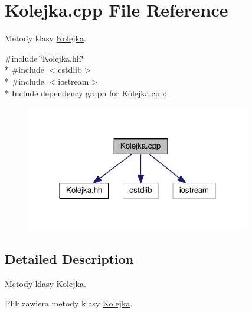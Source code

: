 \hypertarget{a00013}{}\section{Kolejka.\+cpp File Reference}
\label{a00013}


Metody klasy \hyperlink{a00004}{Kolejka}.  


{\ttfamily \#include \char`\"{}Kolejka.\+hh\char`\"{}}\\*
{\ttfamily \#include $<$cstdlib$>$}\\*
{\ttfamily \#include $<$iostream$>$}\\*
Include dependency graph for Kolejka.\+cpp\+:\nopagebreak
\begin{figure}[H]
\begin{center}
\leavevmode
\includegraphics[width=278pt]{a00031}
\end{center}
\end{figure}


\subsection{Detailed Description}
Metody klasy \hyperlink{a00004}{Kolejka}. 

Plik zawiera metody klasy \hyperlink{a00004}{Kolejka}. 